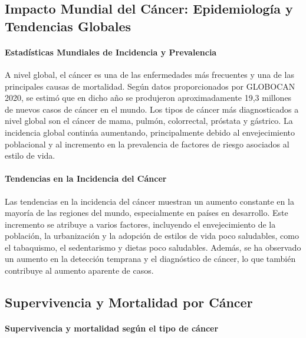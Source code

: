 \subsection{Impacto Mundial del Cáncer: Epidemiología y Tendencias Globales}
\label{sec:impact-cancer}

\paragraph[short]{Estadísticas Mundiales de Incidencia y Prevalencia}

A nivel global, el cáncer es una de las enfermedades más frecuentes y una de las principales causas de mortalidad. Según datos proporcionados por GLOBOCAN 2020\cite{globocan2020}, se estimó que en dicho año se produjeron aproximadamente 19,3 millones de nuevos casos de cáncer en el mundo. Los tipos de cáncer más diagnosticados a nivel global son el cáncer de mama, pulmón, colorrectal, próstata y gástrico. La incidencia global continúa aumentando, principalmente debido al envejecimiento poblacional y al incremento en la prevalencia de factores de riesgo asociados al estilo de vida.

\paragraph[short]{Tendencias en la Incidencia del Cáncer}
Las tendencias en la incidencia del cáncer muestran un aumento constante en la mayoría de las regiones del mundo, especialmente en países en desarrollo. Este incremento se atribuye a varios factores, incluyendo el envejecimiento de la población, la urbanización y la adopción de estilos de vida poco saludables, como el tabaquismo, el sedentarismo y dietas poco saludables. Además, se ha observado un aumento en la detección temprana y el diagnóstico de cáncer, lo que también contribuye al aumento aparente de casos\cite{Zhou2024}.
\subsection{Supervivencia y Mortalidad por Cáncer}
\label{sec:survival-mortality}
\lipsum[1-2]



\paragraph[short]{Supervivencia y mortalidad según el tipo de cáncer}


